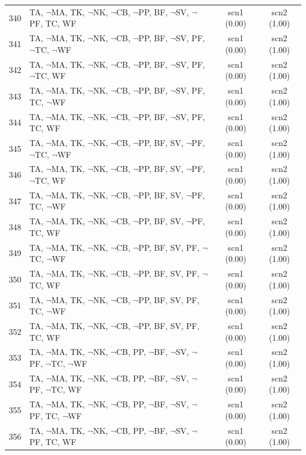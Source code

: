 \documentclass[12pt]{article}
\begin{document}
\begin{longtable}{|l|l|c|c|}
340 & TA, $\neg$MA, TK, $\neg$NK, $\neg$CB, $\neg$PP, BF, $\neg$SV, $\neg$PF, TC, WF & scn1 (0.00) & scn2 (1.00)\\
341 & TA, $\neg$MA, TK, $\neg$NK, $\neg$CB, $\neg$PP, BF, $\neg$SV, PF, $\neg$TC, $\neg$WF & scn1 (0.00) & scn2 (1.00)\\
342 & TA, $\neg$MA, TK, $\neg$NK, $\neg$CB, $\neg$PP, BF, $\neg$SV, PF, $\neg$TC, WF & scn1 (0.00) & scn2 (1.00)\\
343 & TA, $\neg$MA, TK, $\neg$NK, $\neg$CB, $\neg$PP, BF, $\neg$SV, PF, TC, $\neg$WF & scn1 (0.00) & scn2 (1.00)\\
344 & TA, $\neg$MA, TK, $\neg$NK, $\neg$CB, $\neg$PP, BF, $\neg$SV, PF, TC, WF & scn1 (0.00) & scn2 (1.00)\\
345 & TA, $\neg$MA, TK, $\neg$NK, $\neg$CB, $\neg$PP, BF, SV, $\neg$PF, $\neg$TC, $\neg$WF & scn1 (0.00) & scn2 (1.00)\\
346 & TA, $\neg$MA, TK, $\neg$NK, $\neg$CB, $\neg$PP, BF, SV, $\neg$PF, $\neg$TC, WF & scn1 (0.00) & scn2 (1.00)\\
347 & TA, $\neg$MA, TK, $\neg$NK, $\neg$CB, $\neg$PP, BF, SV, $\neg$PF, TC, $\neg$WF & scn1 (0.00) & scn2 (1.00)\\
348 & TA, $\neg$MA, TK, $\neg$NK, $\neg$CB, $\neg$PP, BF, SV, $\neg$PF, TC, WF & scn1 (0.00) & scn2 (1.00)\\
349 & TA, $\neg$MA, TK, $\neg$NK, $\neg$CB, $\neg$PP, BF, SV, PF, $\neg$TC, $\neg$WF & scn1 (0.00) & scn2 (1.00)\\
350 & TA, $\neg$MA, TK, $\neg$NK, $\neg$CB, $\neg$PP, BF, SV, PF, $\neg$TC, WF & scn1 (0.00) & scn2 (1.00)\\
351 & TA, $\neg$MA, TK, $\neg$NK, $\neg$CB, $\neg$PP, BF, SV, PF, TC, $\neg$WF & scn1 (0.00) & scn2 (1.00)\\
352 & TA, $\neg$MA, TK, $\neg$NK, $\neg$CB, $\neg$PP, BF, SV, PF, TC, WF & scn1 (0.00) & scn2 (1.00)\\
353 & TA, $\neg$MA, TK, $\neg$NK, $\neg$CB, PP, $\neg$BF, $\neg$SV, $\neg$PF, $\neg$TC, $\neg$WF & scn1 (0.00) & scn2 (1.00)\\
354 & TA, $\neg$MA, TK, $\neg$NK, $\neg$CB, PP, $\neg$BF, $\neg$SV, $\neg$PF, $\neg$TC, WF & scn1 (0.00) & scn2 (1.00)\\
355 & TA, $\neg$MA, TK, $\neg$NK, $\neg$CB, PP, $\neg$BF, $\neg$SV, $\neg$PF, TC, $\neg$WF & scn1 (0.00) & scn2 (1.00)\\
356 & TA, $\neg$MA, TK, $\neg$NK, $\neg$CB, PP, $\neg$BF, $\neg$SV, $\neg$PF, TC, WF & scn1 (0.00) & scn2 (1.00)\\

\end{longtable}
\end{document}
